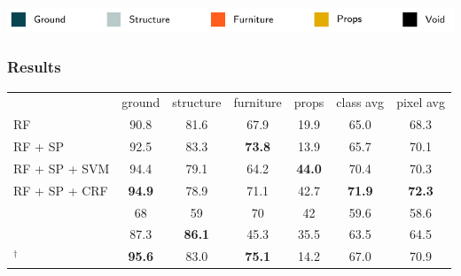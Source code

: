 \documentclass[final,ignorenonframetext,compress]{beamer}
\begin{document}
\begin{frame}
\begin{tabularx}{\linewidth}{@{\extracolsep{\fill}}cccccc}
    \end{tabularx}
    \includegraphics[width=\linewidth]{images/legend.pdf}
\end{frame}

\begin{frame}
    \frametitle{Results}
    \begin{table}[t]
    \begin{tabularx}{\linewidth}{@{\extracolsep{\fill}}lcccccc}
    \toprule
                            & \footnotesize ground        & \footnotesize  structure    & \footnotesize furniture     & \footnotesize props         & \footnotesize class avg   & \footnotesize pixel avg\\
    \cmidrule(r){1-7}

    \footnotesize RF                              &         90.8  &   81.6        & 67.9          & 19.9          &  65.0        &  68.3 \\
    \footnotesize RF + SP                         &         92.5  &   83.3        & \textbf{73.8} & 13.9          &  65.7        &  70.1 \\ 
    \footnotesize RF + SP + SVM                   &         94.4  &   79.1        & 64.2          & \textbf{44.0} &  70.4        &  70.3 \\
    \footnotesize RF + SP + CRF                   & \textbf{94.9} &   78.9        &          71.1 & 42.7          &\textbf{71.9} &  \textbf{72.3} \\
    \cmidrule(r){1-7}
    \footnotesize \textcite{SilbermanECCV12}         &         68    &   59          & 70           & 42            &  59.6        & 58.6 \\
    \footnotesize \textcite{couprie-iclr-13}         &         87.3  & \textbf{86.1} & 45.3         & 35.5          &  63.5        & 64.5 \\
    \cmidrule(r){1-7}
    \footnotesize \textcite{stueckler2013}$^\dagger$ & \textbf{95.6} &   83.0        & \textbf{75.1}& 14.2          &  67.0        & 70.9 \\

    \bottomrule
    \end{tabularx}
    \end{table}
\end{frame}
\end{document}
